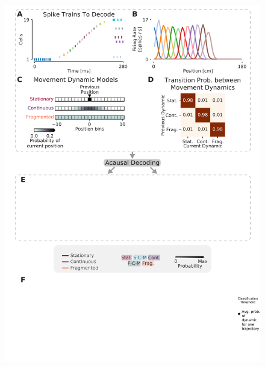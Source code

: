 \documentclass[9pt,lineno]{elife}
\providecommand{\DIFaddbeginFL}{} %
\providecommand{\DIFdelbeginFL}{} %
\providecommand{\DIFdelendFL}{} %
\newcommand{\DIFscaledelfig}{0.5}
\newlength{\DIFdelgraphicswidth} %
\newlength{\DIFdelgraphicsheight} %
\newcommand{\DIFaddincludegraphics}[2][]{{\color{blue}\fbox{\DIFOincludegraphics[#1]{#2}}}} %
\newcommand{\DIFdelincludegraphics}[2][]{%
\sbox{\DIFdelgraphicsbox}{\DIFOincludegraphics[#1]{#2}}%
\settoboxwidth{\DIFdelgraphicswidth}{\DIFdelgraphicsbox} %
\settoboxtotalheight{\DIFdelgraphicsheight}{\DIFdelgraphicsbox} %
\scalebox{\DIFscaledelfig}{%
\parbox[b]{\DIFdelgraphicswidth}{\usebox{\DIFdelgraphicsbox}\\[-\baselineskip] \rule{\DIFdelgraphicswidth}{0em}}\llap{\resizebox{\DIFdelgraphicswidth}{\DIFdelgraphicsheight}{%
\setlength{\unitlength}{\DIFdelgraphicswidth}%
\begin{picture}(1,1)%
\thicklines\linethickness{2pt} %
{\color[rgb]{1,0,0}\put(0,0){\framebox(1,1){}}}%
{\color[rgb]{1,0,0}\put(0,0){\line( 1,1){1}}}%
{\color[rgb]{1,0,0}\put(0,1){\line(1,-1){1}}}%
\end{picture}%
}\hspace*{3pt}}} %
} %
\DeclareRobustCommand{\DIFaddbeginFL}{\DIFOaddbeginFL \let\includegraphics\DIFaddincludegraphics} %
\DeclareRobustCommand{\DIFdelbeginFL}{\DIFOdelbeginFL \let\includegraphics\DIFdelincludegraphics} %
\DeclareRobustCommand{\DIFdelendFL}{\DIFOaddendFL \let\includegraphics\DIFOincludegraphics} %
\begin{document}
\begin{figure}
\DIFdelbeginFL %
\DIFdelendFL \DIFaddbeginFL \includegraphics[width=0.65\linewidth]{figures/Figure1/Figure1_final}

\end{figure}
\end{document}
